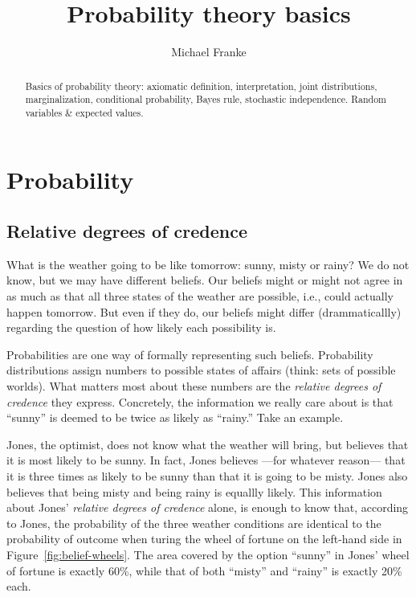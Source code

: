 \documentclass[nobib,nofonts]{tufte-handout}
\title{Probability theory basics}
\author[M.~Franke]{Michael Franke}
\date{} %
\begin{document}
\maketitle

\begin{abstract}
\noindent
Basics of probability theory:
axiomatic definition,
interpretation,
joint distributions,
marginalization,
conditional probability,
Bayes rule,
stochastic independence.
Random variables \& expected values.
\end{abstract}

\section{Probability}

\subsection{Relative degrees of credence}

What is the weather going to be like tomorrow: sunny, misty or rainy?
We do not know, but we may have different beliefs.
Our beliefs might or might not agree in as much as that all three states of the weather are possible, i.e., could actually happen tomorrow.
But even if they do, our beliefs might differ (drammaticallly) regarding the question of how likely each possibility is.

Probabilities are one way of formally representing such beliefs.
Probability distributions assign numbers to possible states of affairs (think: sets of possible worlds).
What matters most about these numbers are the \emph{relative degrees of credence} they express.
Concretely, the information we really care about is that ``sunny'' is deemed to be twice as likely as ``rainy.''
Take an example.

Jones, the optimist, does not know what the weather will bring, but believes that it is most likely to be sunny.
In fact, Jones believes ---for whatever reason--- that it is three times as likely to be sunny than that it is going to be misty.
Jones also believes that being misty and being rainy is equallly likely.
This information about Jones' \emph{relative degrees of credence} alone, is enough to know that, according to Jones, the probability of the three weather conditions are identical to the probability of outcome when turing the wheel of fortune on the left-hand side in Figure~\ref{fig:belief-wheels}.
The area covered by the option ``sunny'' in Jones' wheel of fortune is exactly 60\%, while that of both ``misty'' and ``rainy'' is exactly 20\% each.
\end{document}
